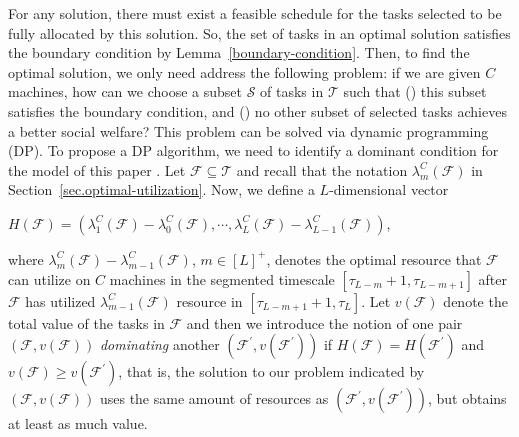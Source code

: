 \documentclass[10pt,journal,compsoc]{IEEEtran}
\newcommand{\rmnum}[1]{\romannumeral #1}
\begin{document}
For any solution, there must exist a feasible schedule for the tasks selected to be fully allocated by this solution. So, the set of tasks in an optimal solution satisfies the boundary condition by Lemma~\ref{boundary-condition}. Then, to find the optimal solution, we only need address the following problem: if we are given $C$ machines, how can we choose a subset $\mathcal{S}$ of tasks in $\mathcal{T}$ such that (\rmnum{1}) this subset satisfies the boundary condition, and (\rmnum{2}) no other subset of selected tasks achieves a better social welfare? This problem can be solved via dynamic programming (DP). To propose a DP algorithm, we need to identify a dominant condition for the model of this paper \cite{Williamson}. Let $\mathcal{F}\subseteq\mathcal{T}$ and recall that the notation $\lambda_{m}^{C}(\mathcal{F})$ in Section~\ref{sec.optimal-utilization}. Now, we define a $L$-dimensional vector
\begin{center}
$H(\mathcal{F})=(\lambda_{1}^{C}(\mathcal{F})-\lambda_{0}^{C}(\mathcal{F}), \cdots, \lambda_{L}^{C}(\mathcal{F})-\lambda_{L-1}^{C}(\mathcal{F}))$,
\end{center}
where $\lambda_{m}^{C}(\mathcal{F})-\lambda_{m-1}^{C}(\mathcal{F})$, $m\in[L]^{+}$, denotes the optimal resource that $\mathcal{F}$ can utilize on $C$ machines in the segmented timescale $[\tau_{L-m}+1, \tau_{L-m+1}]$ after $\mathcal{F}$ has utilized $\lambda_{m-1}^{C}(\mathcal{F})$ resource in $[\tau_{L-m+1}+1, \tau_{L}]$. Let $v(\mathcal{F})$ denote the total value of the tasks in $\mathcal{F}$ and then we introduce the notion of one pair $(\mathcal{F}, v(\mathcal{F}))$ {\em dominating} another $(\mathcal{F}^{\prime}, v(\mathcal{F}^{\prime}))$ if $H(\mathcal{F})=H(\mathcal{F}^{\prime})$ and $v(\mathcal{F})\geq v(\mathcal{F}^{\prime})$, that is, the solution to our problem indicated by $(\mathcal{F}, v(\mathcal{F}))$ uses the same amount of resources as $(\mathcal{F}^{\prime}, v(\mathcal{F}^{\prime}))$, but obtains at least as much value.
\end{document}
